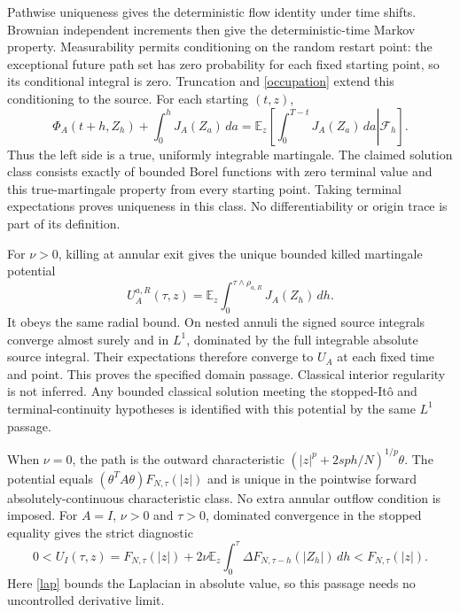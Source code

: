 \documentclass[11pt]{article}
\newcommand{\E}{\mathbb E}
\begin{document}
Pathwise uniqueness gives the deterministic flow identity under time
shifts. Brownian independent increments then give the deterministic-time
Markov property. Measurability permits conditioning on the random
restart point: the exceptional future path set has zero probability
for each fixed starting point, so its conditional integral is zero.
Truncation and \eqref{occupation} extend this conditioning to the source.
For each starting $(t,z)$,
\[
 \Phi_A(t+h,Z_h)+\int_0^hJ_A(Z_a)\,da
 =\E_z\left[\left.\int_0^{T-t}J_A(Z_a)\,da\right|\mathcal F_h\right].
\]
Thus the left side is a true, uniformly integrable martingale.
The claimed solution class consists exactly of bounded Borel functions
with zero terminal value and this true-martingale property from every
starting point. Taking terminal expectations proves uniqueness in this
class. No differentiability or origin trace is part of its definition.

For $\nu>0$, killing at annular exit gives the unique bounded killed
martingale potential
\[
 U_A^{a,R}(\tau,z)=\E_z\int_0^{\tau\wedge\rho_{a,R}}J_A(Z_h)\,dh.
\]
It obeys the same radial bound. On nested annuli the signed source
integrals converge almost surely and in $L^1$, dominated by the full
integrable absolute source integral. Their expectations therefore converge
to $U_A$ at each fixed time and point. This proves the specified domain
passage. Classical interior regularity is not inferred. Any bounded
classical solution meeting the stopped-It\^o and terminal-continuity
hypotheses is identified with this potential by the same $L^1$ passage.

When $\nu=0$, the path is the outward characteristic
$(|z|^p+2sp h/N)^{1/p}\theta$. The potential equals
$(\theta^TA\theta)F_{N,\tau}(|z|)$ and is unique in the pointwise forward
absolutely-continuous characteristic class. No extra annular outflow
condition is imposed. For $A=I$, $\nu>0$ and $\tau>0$, dominated convergence
in the stopped equality gives the strict diagnostic
\[
 0<U_I(\tau,z)=F_{N,\tau}(|z|)
       +2\nu\E_z\int_0^\tau\Delta F_{N,\tau-h}(|Z_h|)\,dh
       <F_{N,\tau}(|z|).
\]
Here \eqref{lap} bounds the Laplacian in absolute value, so this passage
needs no uncontrolled derivative limit.
\end{document}
